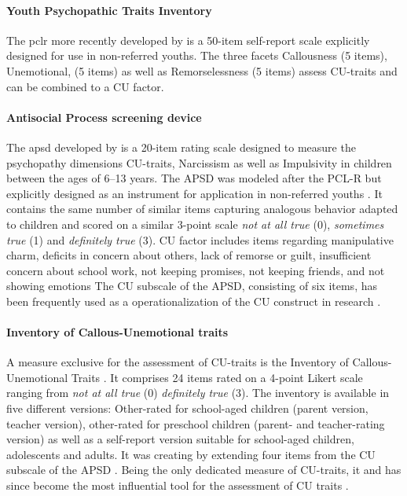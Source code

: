 \paragraph{Youth Psychopathic Traits Inventory}
The \gls{pclr} more recently developed by \textcites{andershed_psychopathic_2012} is a 50-item self-report scale explicitly designed for use in non-referred youths.
The three facets Callousness (5 items), Unemotional, (5 items) as well as Remorselessness (5 items) assess CU-traits and can be combined to a CU factor.

\paragraph{Antisocial Process screening device}
The \gls{apsd} developed by \textcites{frick_antisocial_2001} is a
20-item rating scale designed to measure the psychopathy dimensions CU-traits, Narcissism
as well as Impulsivity in children between the ages of 6–13 years. 
The APSD was modeled after the PCL-R but explicitly designed as an instrument for application in non-referred youths \parencite{andershed_psychopathic_2012}.
It contains the same number of similar items capturing analogous behavior adapted to children and scored on a similar 3-point scale \textit{not at all true} (0), 
\textit{sometimes true} (1) and \textit{definitely true} (3). 
CU factor includes items regarding manipulative charm, deficits in concern about others, lack of remorse or guilt, insufficient concern about school work, not keeping promises, not keeping friends, and not showing emotions
The CU subscale of the APSD, consisting of six items, has been frequently used as a operationalization of the CU construct in research \parencite{viding_callousunemotional_2018}.

\paragraph{Inventory of Callous-Unemotional traits}
A measure exclusive for the assessment of CU-traits is the Inventory of Callous-Unemotional Traits \parencite{frick_icu_2004}. 
It comprises 24 items rated on a 4-point Likert scale ranging from \textit{not at all true} (0) \textit{definitely true} (3). 
The inventory is available in five different versions: Other-rated for school-aged children (parent version, teacher version), 
other-rated for preschool children (parent- and teacher-rating version) as well as a self-report version suitable for school-aged children, adolescents and adults.
It was creating by extending four items from the CU subscale of the APSD \parencite{kimonis_using_2015}.
Being the only dedicated measure of CU-traits, it and has since become the most influential tool for the assessment of CU traits
\parencite{cardinale_reliability_2017}.


